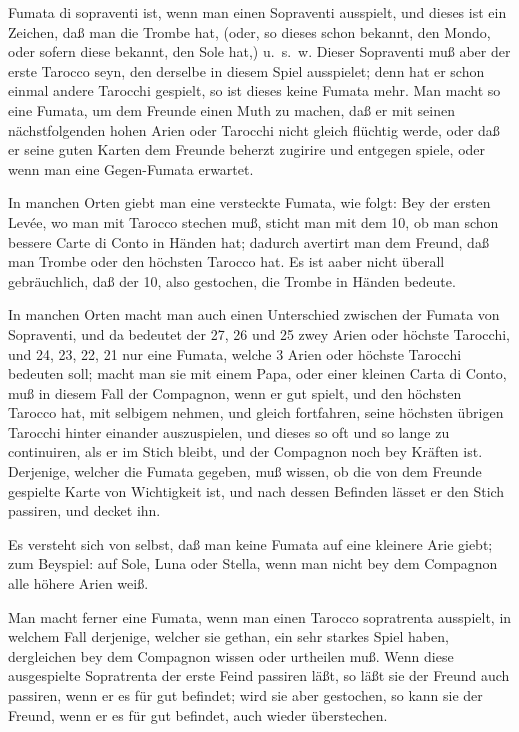 \documentclass[11pt,a6paper,twoside]{article}
\begin{document}
Fumata di sopraventi ist, wenn man einen Sopraventi ausspielt, und dieses ist ein Zeichen, daß man die Trombe hat, (oder, so dieses schon bekannt, den Mondo, oder sofern diese bekannt, den Sole hat,) u.~s.~w. Dieser Sopraventi muß aber der erste Tarocco seyn, den derselbe in diesem Spiel ausspielet; denn hat er schon einmal andere Tarocchi gespielt, so ist dieses keine Fumata mehr. Man macht so eine Fumata, um dem Freunde einen Muth zu machen, daß er mit seinen nächstfolgenden hohen Arien oder Tarocchi nicht gleich flüchtig werde, oder daß er seine guten Karten dem Freunde beherzt zugirire und entgegen spiele, oder wenn man eine Gegen-Fumata erwartet.

In manchen Orten giebt man eine versteckte Fumata, wie folgt: Bey der ersten Levée, wo man mit Tarocco stechen muß, sticht man mit dem 10, ob man schon bessere Carte di Conto in Händen hat; dadurch avertirt man dem Freund, daß man Trombe oder den höchsten Tarocco hat. Es ist aaber nicht überall gebräuchlich, daß der 10, also gestochen, die Trombe in Händen bedeute.

In manchen Orten macht man auch einen Unterschied zwischen der Fumata von Sopraventi, und da bedeutet der 27, 26 und 25 zwey Arien oder höchste Tarocchi, und 24, 23, 22, 21 nur eine Fumata, welche 3 Arien oder höchste Tarocchi bedeuten soll; macht man sie mit einem Papa, oder einer kleinen Carta di Conto, muß in diesem Fall der Compagnon, wenn er gut spielt, und den höchsten Tarocco hat, mit selbigem nehmen, und gleich fortfahren, seine höchsten übrigen Tarocchi hinter einander auszuspielen, und dieses so oft und so lange zu continuiren, als er im Stich bleibt, und der Compagnon noch bey Kräften ist. Derjenige, welcher die Fumata gegeben, muß wissen, ob die von dem Freunde gespielte Karte von Wichtigkeit ist, und nach dessen Befinden lässet er den Stich passiren, und decket ihn.

Es versteht sich von selbst, daß man keine Fumata auf eine kleinere Arie giebt; zum Beyspiel: auf Sole, Luna oder Stella, wenn man nicht bey dem Compagnon alle höhere Arien weiß.

Man macht ferner eine Fumata, wenn man einen Tarocco sopratrenta ausspielt, in welchem Fall derjenige, welcher sie gethan, ein sehr starkes Spiel haben, dergleichen bey dem Compagnon wissen oder urtheilen muß. Wenn diese ausgespielte Sopratrenta der erste Feind passiren läßt, so läßt sie der Freund auch passiren, wenn er es für gut befindet; wird sie aber gestochen, so kann sie der Freund, wenn er es für gut befindet, auch wieder überstechen.
\end{document}
